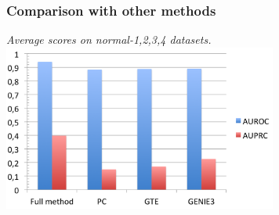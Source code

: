 \documentclass[final]{beamer}
\begin{document}

\begin{frame}
\frametitle{Comparison with other methods}


\begin{center}
\textit{Average scores on normal-{1,2,3,4} datasets.
}
\includegraphics[width=9cm]{images/data_method.png}
\end{center}


\end{frame}


\end{document}
